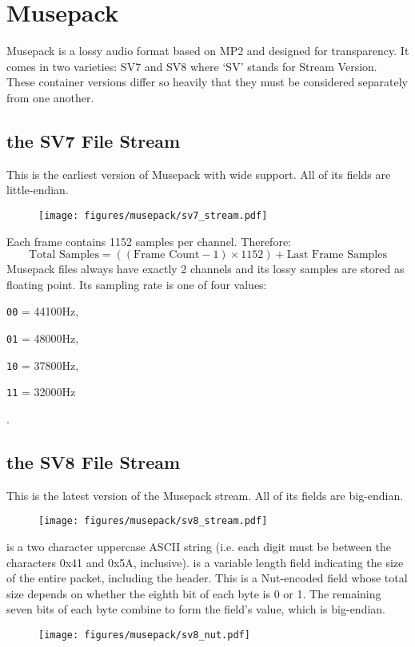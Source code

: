 
\chapter{Musepack}
Musepack is a lossy audio format based on MP2 and designed for
transparency.
It comes in two varieties: SV7 and SV8 where `SV' stands for
Stream Version.
These container versions differ so heavily that they must be
considered separately from one another.
\section{the SV7 File Stream}
This is the earliest version of Musepack with wide support.
All of its fields are little-endian.
\begin{figure}[h]
\texttt{[image: figures/musepack/sv7\_stream.pdf]}
\end{figure}
Each frame contains 1152 samples per channel.
Therefore:
\begin{equation}
\text{Total Samples} = ((\text{Frame Count} - 1) \times 1152) + \text{Last Frame Samples}
\end{equation}
Musepack files always have exactly 2 channels and its lossy samples
are stored as floating point.
Its sampling rate is one of four values:

\begin{inparaenum}
\item[\texttt{00} = ] 44100Hz,
\item[\texttt{01} = ] 48000Hz,
\item[\texttt{10} = ] 37800Hz,
\item[\texttt{11} = ] 32000Hz
\end{inparaenum}
.

\pagebreak

\section{the SV8 File Stream}
This is the latest version of the Musepack stream.
All of its fields are big-endian.
\begin{figure}[h]
\texttt{[image: figures/musepack/sv8\_stream.pdf]}
\end{figure}
\par
\noindent
{} is a two character uppercase ASCII string
(i.e. each digit must be between the characters 0x41 and 0x5A, inclusive).
 is a variable length field indicating the size of the entire packet,
including the header.
This is a Nut-encoded field whose total size depends on whether
the eighth bit of each byte is 0 or 1.
The remaining seven bits of each byte combine to form the field's value,
which is big-endian.
\begin{figure}[h]
\texttt{[image: figures/musepack/sv8\_nut.pdf]}
\end{figure}

